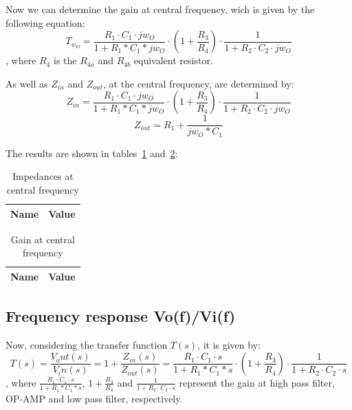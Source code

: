 Now we can determine the gain at central frequency, wich is given by the following equation:
\begin{equation}
	T_{w_O}=\frac{R_1\cdot C_1 \cdot jw_O}{1+R_1*C_1*jw_O}\cdot(1+ \frac{R_3}{R_4}) \cdot \frac{1}{1+R_2 \cdot C_2\cdot jw_O}
\end{equation}
, where $R_4$ is the $R_{4a}$ and $R_{4b}$ equivalent resistor.

As well as $Z_{in}$ and $Z_{out}$, at the central frequency, are determined by:
\begin{equation}
	Z_{in}=\frac{R_1\cdot C_1 \cdot jw_O}{1+R_1*C_1*jw_O}\cdot(1+ \frac{R_3}{R_4}) \cdot \frac{1}{1+R_2 \cdot C_2\cdot jw_O}
\end{equation}
\begin{equation}
	Z_{out}=R_1+\frac{1}{jw_O*C_1}
\end{equation}

The results are shown in tables~\ref{tab:results1} and~\ref{tab:results2}:
\begin{table}[H]
  \centering
  \begin{tabular}{|l|r|}
     \hline    
    {\bf Name} & {\bf Value} \\ \hline   
    
  \end{tabular}
  \caption{Impedances at central frequency}
  \label{tab:results1}
\end{table}
\begin{table}[H]
  \centering
  \begin{tabular}{|l|r|}
     \hline    
    {\bf Name} & {\bf Value} \\ \hline   
    
  \end{tabular}
  \caption{Gain at central frequency}
  \label{tab:results2}
\end{table}

\subsection{Frequency response Vo(f)/Vi(f)}
Now, considering the transfer function $T(s)$, it is given by:
\begin{equation}
	T(s)=\frac{V_out(s)}{V_in(s)}=1+\frac{Z_{in}(s)}{Z_{out}(s)}=\frac{R_1\cdot C_1 \cdot s}{1+R_1*C_1*s}\cdot(1+ \frac{R_3}{R_4}) \cdot \frac{1}{1+R_2 \cdot C_2\cdot s}
\end{equation}
, where $\frac{R_1\cdot C_1 \cdot s}{1+R_1*C_1*s}$, $1+\frac{R_3}{R_4}$ and $\frac{1}{1+R_2\cdot C_2\cdot s}$ represent
the gain at high pass filter, OP-AMP and low pass filter, respectively.

